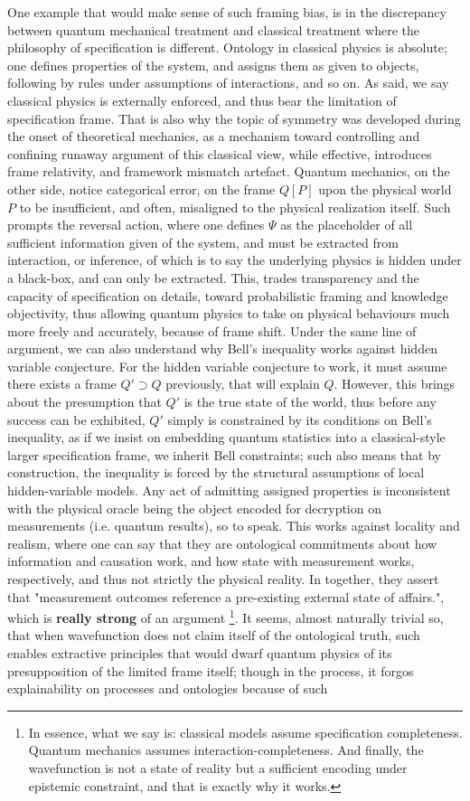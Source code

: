 One example that would make sense of such framing bias, is in the discrepancy between quantum mechanical treatment and classical treatment where the philosophy of specification is different. Ontology in classical physics is absolute; one defines properties of the system, and assigns them as given to objects, following by rules under assumptions of interactions, and so on. As said, we say classical physics is externally enforced, and thus bear the limitation of specification frame. That is also why the topic of symmetry was developed during the onset of theoretical mechanics, as a mechanism toward controlling and confining runaway argument of this classical view, while effective, introduces frame relativity, and framework mismatch artefact. Quantum mechanics, on the other side, notice categorical error, on the frame $Q[P]$ upon the physical world $P$ to be insufficient, and often, misaligned to the physical realization itself. Such prompts the reversal action, where one defines $\Psi$ as the placeholder of all sufficient information given of the system, and must be extracted from interaction, or inference, of which is to say the underlying physics is hidden under a black-box, and can only be extracted. This, trades transparency and the capacity of specification on details, toward probabilistic framing and knowledge objectivity, thus allowing quantum physics to take on physical behaviours much more freely and accurately, because of frame shift. Under the same line of argument, we can also understand why Bell's inequality works against hidden variable conjecture. For the hidden variable conjecture to work, it must assume there exists a frame $Q'\supset Q$ previously, that will explain $Q$. However, this brings about the presumption that $Q'$ is the true state of the world, thus before any success can be exhibited, $Q'$ simply is constrained by its conditions on Bell's inequality, as if we insist on embedding quantum statistics into a classical-style larger specification frame, we inherit Bell constraints; such also means that by construction, the inequality is forced by the structural assumptions of local hidden-variable models. Any act of admitting assigned properties is inconsistent with the physical oracle being the object encoded for decryption on measurements (i.e. quantum results), so to speak. This works against locality and realism, where one can say that they are ontological commitments about how information and causation work, and how state with measurement works, respectively, and thus not strictly the physical reality. In together, they assert that "measurement outcomes reference a pre-existing external state of affairs.", which is \textbf{really strong} of an argument \footnote{In essence, what we say is: classical models assume specification completeness. Quantum mechanics assumes interaction-completeness. And finally, the wavefunction is not a state of reality but a sufficient encoding under epistemic constraint, and that is exactly why it works.}. It seems, almost naturally trivial so, that when wavefunction does not claim itself of the ontological truth, such enables extractive principles that would dwarf quantum physics of its presupposition of the limited frame itself; though in the process, it forgos explainability on processes and ontologies because of such 